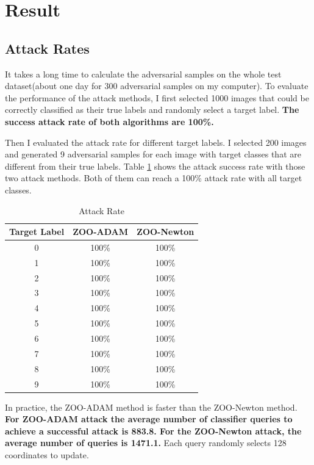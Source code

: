 \documentclass[a4paper]{article}
\begin{document}
\section{Result}


\subsection{Attack Rates}
It takes a long time to calculate the adversarial samples on the whole test dataset(about one day for 300 adversarial samples on my computer). To evaluate the performance of the attack methods, I first selected 1000 images that could be correctly classified as their true labels and randomly select a target label. \textbf{The success attack rate of both algorithms are 100\%.}

Then I evaluated the attack rate for different target labels.
I selected 200 images and generated 9 adversarial samples for each image with target classes that are different from their true labels. Table \ref{ar} shows the attack success rate with those two attack methods. Both of them can reach a 100\% attack rate with all target classes. 

\begin{table}[h]
\centering
\begin{tabular}{ccc}
\hline
Target Label&ZOO-ADAM&ZOO-Newton\\
\hline
0& 100\%&100\%\\
1& 100\%&100\%\\
2& 100\%&100\%\\
3& 100\%&100\%\\
4& 100\%&100\%\\
5& 100\%&100\%\\
6& 100\%&100\%\\
7& 100\%&100\%\\
8& 100\%&100\%\\
9& 100\%&100\%\\
\hline
\end{tabular}
\label{ar}
\caption{Attack Rate}
\end{table}
In practice, the ZOO-ADAM method is faster than the ZOO-Newton method.
\textbf{For ZOO-ADAM attack the average number of classifier queries to achieve a successful attack is 883.8.
For the ZOO-Newton attack, the average number of queries is 1471.1. }Each query randomly selects 128 coordinates to update.
\end{document}
